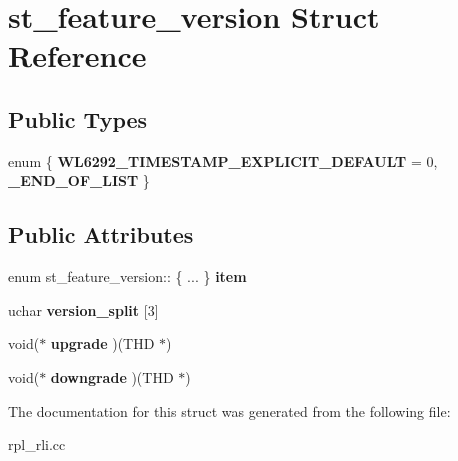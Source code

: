 \hypertarget{structst__feature__version}{}\section{st\+\_\+feature\+\_\+version Struct Reference}
\label{structst__feature__version}
\subsection*{Public Types}
\begin{DoxyCompactItemize}
\item 
\mbox{\label{structst__feature__version_abac9096f9a4fc929201b4deb9778e080}} 
enum \{ {\bfseries W\+L6292\+\_\+\+T\+I\+M\+E\+S\+T\+A\+M\+P\+\_\+\+E\+X\+P\+L\+I\+C\+I\+T\+\_\+\+D\+E\+F\+A\+U\+LT} = 0, 
{\bfseries \+\_\+\+E\+N\+D\+\_\+\+O\+F\+\_\+\+L\+I\+ST}
 \}
\end{DoxyCompactItemize}
\subsection*{Public Attributes}
\begin{DoxyCompactItemize}
\item 
\mbox{\label{structst__feature__version_a50c769857c0db5133121949df386908e}} 
enum st\+\_\+feature\+\_\+version\+:: \{ ... \}  {\bfseries item}
\item 
\mbox{\label{structst__feature__version_a2d720d02d288078d64749f28c7689f17}} 
uchar {\bfseries version\+\_\+split} \mbox{[}3\mbox{]}
\item 
\mbox{\label{structst__feature__version_ac13f1e0b049f15af94f68a16450a6223}} 
void($\ast$ {\bfseries upgrade} )(T\+HD $\ast$)
\item 
\mbox{\label{structst__feature__version_a735f5299fcd7c6f9b191a16583b6de12}} 
void($\ast$ {\bfseries downgrade} )(T\+HD $\ast$)
\end{DoxyCompactItemize}


The documentation for this struct was generated from the following file\+:\begin{DoxyCompactItemize}
\item 
rpl\+\_\+rli.\+cc\end{DoxyCompactItemize}
